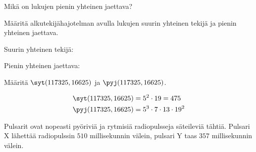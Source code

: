 \begin{kotitehtavasivu}
\begin{tehtava}
\end{tehtava}

\begin{tehtava}
    Mikä on lukujen pienin yhteinen jaettava?
    

    \begin{vastaus}
    
    \end{vastaus}
    
\end{tehtava}

\begin{tehtava}
    Määritä alkutekijähajotelman avulla lukujen
    suurin yhteinen tekijä ja pienin yhteinen jaettava.

    \begin{vastaus}
        Suurin yhteinen tekijä:

        Pienin yhteinen jaettava:
    \end{vastaus}
    
\end{tehtava}

\begin{tehtava}
    Määritä $\syt(117325, 16625)$ ja $\pyj(117325, 16625)$.
    
    \begin{vastaus}
        \begin{align*}
        \syt(117325, 16625) &= 5^2\cdot 19 = 475 \\
        \pyj(117325, 16625) &= 5^3\cdot 7\cdot 13\cdot 19^2
        \end{align*}
    \end{vastaus}
    
\end{tehtava}

\begin{tehtava}
    Pulsarit ovat nopeasti pyöriviä ja rytmisiä radiopulsseja säteileviä tähtiä. Pulsari X lähettää radiopulssin $510$ millisekunnin välein, pulsari Y taas $357$ millisekunnin välein.


\end{tehtava}
\end{kotitehtavasivu}
